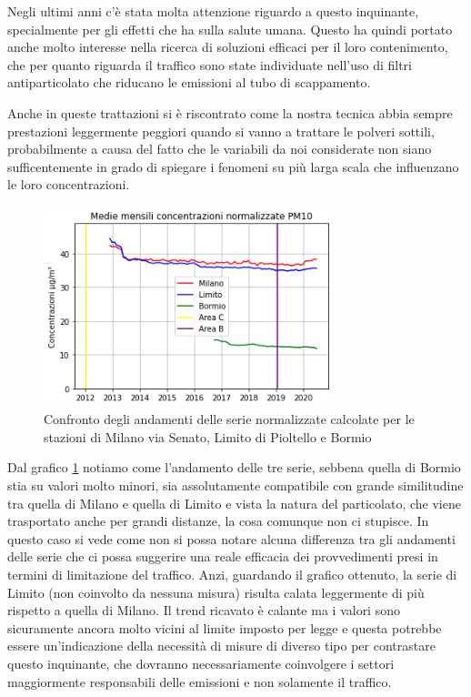 \documentclass[a4paper]{report}
\begin{document}
Negli ultimi anni c'è stata molta attenzione riguardo a questo inquinante, specialmente per gli effetti che ha sulla salute umana.
Questo ha quindi portato anche molto interesse nella ricerca di soluzioni efficaci per il loro contenimento, che per quanto riguarda il traffico sono state individuate nell'uso di filtri antiparticolato che riducano le emissioni al tubo di scappamento. 

Anche in queste trattazioni si è riscontrato come la nostra tecnica abbia sempre prestazioni leggermente peggiori quando si vanno a trattare le polveri sottili, probabilmente a causa del fatto che le variabili da noi considerate non siano sufficentemente in grado di spiegare i fenomeni su più larga scala che influenzano le loro concentrazioni.

\begin{figure}[h]
\centering
\includegraphics[width=0.75\textwidth]{pm10_traffico}
\caption{Confronto degli andamenti delle serie normalizzate calcolate per le stazioni di Milano via Senato, Limito di Pioltello e Bormio}
\label{fig:pm10_traffico}
\end{figure}

Dal grafico \ref{fig:pm10_traffico} notiamo come l'andamento delle tre serie, sebbena quella di Bormio stia su valori molto minori, sia assolutamente compatibile con grande similitudine tra quella di Milano e quella di Limito e vista la natura del particolato, che viene trasportato anche per grandi distanze, la cosa comunque non ci stupisce. In questo caso si vede come non si possa notare alcuna differenza tra gli andamenti delle serie che ci possa suggerire una reale efficacia dei provvedimenti presi in termini di limitazione del traffico. Anzi, guardando il grafico ottenuto, la serie di Limito (non coinvolto da nessuna misura) risulta calata leggermente di più rispetto a quella di Milano.
Il trend ricavato è calante ma i valori sono sicuramente ancora molto vicini al limite imposto per legge e questa potrebbe essere un'indicazione della necessità di misure di diverso tipo per contrastare questo inquinante, che dovranno necessariamente coinvolgere i settori maggiormente responsabili delle emissioni e non solamente il traffico.
\end{document}
